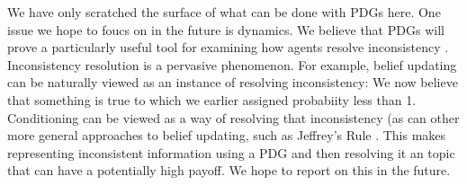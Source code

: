 \documentclass[letterpaper]{article} %
\theoremstyle{plain}
\theoremstyle{definition}
\theoremstyle{remark}
\newcommand{\todo}[1]{{\color{red}\ \!\Large\smash{\textbf{[}}{\normalsize\textsc{todo:} #1}\ \!\smash{\textbf{]}}}}
\begin{document}
We have only scratched the surface of what can be done with PDGs here.
%
One issue we hope to foucs on in the future is dynamics.  We believe
that PDGs will prove a particularly useful tool for examining how agents resolve
inconsistency%
.
Inconsistency resolution is a pervasive phenomenon.
For example, belief updating can be naturally viewed as an instance of
resolving inconsistency: We now believe that something is true to
which we earlier assigned probabiity less than 1.  Conditioning can be
viewed as a way of resolving that inconsistency (as can other more
general approaches to belief updating, such as Jeffrey's Rule
\cite{Jeffrey68}. 
%
This makes representing inconsistent information using a PDG and then
resolving it an topic that can have a potentially high payoff.
We hope to report on this in the future.

	
\end{document}
